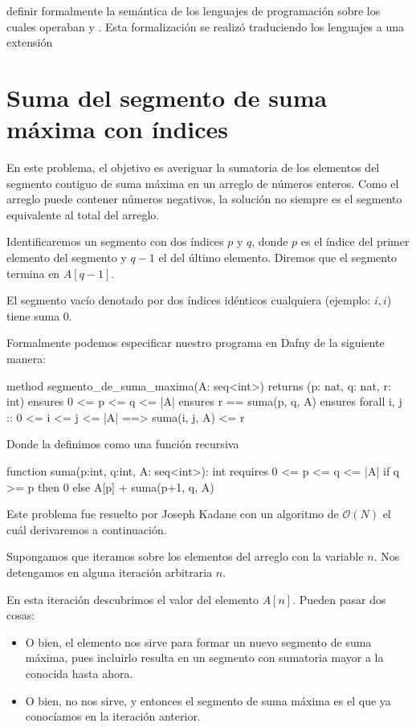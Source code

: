 \documentclass[12pt, a4paper, openany, fleqn]{book}
\begin{document}
    definir formalmente la semántica de los lenguajes de programación sobre los cuales operaban y . Esta formalización se realizó traduciendo los lenguajes a una extensión  

    \section{Suma del segmento de suma máxima con índices}
    En este problema, el objetivo es averiguar la sumatoria de los elementos del segmento contiguo de suma máxima en un arreglo de números enteros.
    Como el arreglo puede contener números negativos, la solución no siempre es el segmento equivalente al total del arreglo.

    Identificaremos un segmento con dos índices $p$ y $q$, donde $p$ es el índice del primer elemento del segmento y $q-1$ el del último elemento. Diremos que el segmento termina en $A[q-1]$.

    El segmento vacío denotado por dos índices idénticos cualquiera (ejemplo: $i,i$) tiene suma 0.

    Formalmente podemos especificar nuestro programa en Dafny de la siguiente manera:

    \begin{dafny}
    method segmento_de_suma_maxima(A: seq<int>)
        returns (p: nat, q: nat, r: int)
        ensures 0 <= p <= q <= |A|
        ensures r == suma(p, q, A)
        ensures forall i, j :: 0 <= i <= j <= |A| ==> suma(i, j, A) <= r
    {
    }
    \end{dafny}

    Donde  la definimos como una función recursiva

    \begin{dafny}
    function suma(p:int, q:int, A: seq<int>): int
        requires 0 <= p <= q <= |A|
    {
        if q >= p then 0 else A[p] + suma(p+1, q, A)
    }
    \end{dafny}

    Este problema fue resuelto por Joseph Kadane con un algoritmo de $\mathcal{O}(N)$ el cuál derivaremos a continuación.

    Supongamos que iteramos sobre los elementos del arreglo con la variable $n$. Nos detengamos en alguna iteración arbitraria $n$.

    En esta iteración descubrimos el valor del elemento $A[n]$. Pueden pasar dos cosas:
    \begin{itemize}
        \item O bien, el elemento nos sirve para formar un nuevo segmento de suma máxima, pues incluirlo resulta en un segmento con sumatoria mayor a la conocida hasta ahora.
        \item O bien, no nos sirve, y entonces el segmento de suma máxima es el que ya conocíamos en la iteración anterior.
    \end{itemize}
\end{document}
